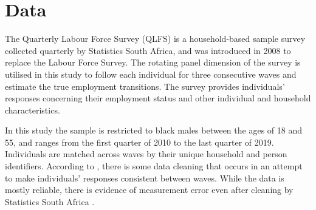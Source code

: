 \documentclass[letterpaper,12pt,final,dvipsnames]{article}
\begin{document}

\section{Data} \label{sec_data}


The Quarterly Labour Force Survey (QLFS) is a household-based sample survey collected quarterly by Statistics South Africa, and was introduced in 2008 to replace the Labour Force Survey. The rotating panel dimension of the survey is utilised in this study to follow each individual for three consecutive waves and estimate the true employment transitions. The survey provides individuals’ responses concerning their employment status and other individual and household characteristics. 
 
In this study the sample is restricted to black males between the ages of 18 and 55, and ranges from the first quarter of 2010 to the last quarter of 2019. Individuals are matched across waves by their unique household and person identifiers. According to \cite{statssa2013}, there is some data cleaning that occurs in an attempt to make individuals’ responses consistent between waves. While the data is mostly reliable, there is evidence of measurement error even after cleaning by Statistics South Africa \citep{burger2016, lechtenfeld2014}.
\end{document}

